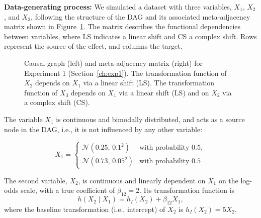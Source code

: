 \medskip

\textbf{Data-generating process: } We simulated a dataset with three variables, $X_1$, $X_2$, and $X_3$, following the structure of the DAG and its associated meta-adjacency matrix shown in Figure~\ref{fig:dag_and_matrix}. The matrix describes the functional dependencies between variables, where LS indicates a linear shift and CS a complex shift. Rows represent the source of the effect, and columns the target.


\begin{figure}[H]
\centering
{}
\caption{Causal graph (left) and meta-adjacency matrix (right) for Experiment 1 (Section~\ref{ch:exp1}). The transformation function of $X_2$ depends on $X_1$ via a linear shift (LS). The transformation function of $X_3$ depends on $X_1$ via a linear shift (LS) and on $X_2$ via a complex shift (CS).}
\label{fig:dag_and_matrix}
\end{figure}

The variable $X_1$ is continuous and bimodally distributed, and acts as a source node in the DAG, i.e., it is not influenced by any other variable:

\[
X_1 = 
\begin{cases}
\mathcal{N}(0.25,\, 0.1^2) & \text{with probability } 0.5, \\
\mathcal{N}(0.73,\, 0.05^2) & \text{with probability } 0.5
\end{cases}
\]


    
The second variable, $X_2$, is continuous and linearly dependent on $X_1$ on the log-odds scale, with a true coefficient of $\beta_{12} = 2$. Its transformation function is 
\[
h(X_2 \mid X_1) = h_I(X_2) + \beta_{12} X_1,
\]
where the baseline transformation (i.e., intercept) of $X_2$ is $h_I(X_2) = 5 X_2$.

